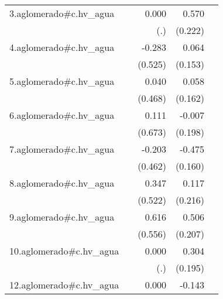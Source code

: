 {\begin{longtable}{l*{4}{D{.}{.}{-1}}}
\addlinespace
3.aglomerado#c.hv\_agua&                     &       0.000         &       0.570\sym{*}  &                     \\
            &                     &         (.)         &     (0.222)         &                     \\
\addlinespace
4.aglomerado#c.hv\_agua&                     &      -0.283         &       0.064         &                     \\
            &                     &     (0.525)         &     (0.153)         &                     \\
\addlinespace
5.aglomerado#c.hv\_agua&                     &       0.040         &       0.058         &                     \\
            &                     &     (0.468)         &     (0.162)         &                     \\
\addlinespace
6.aglomerado#c.hv\_agua&                     &       0.111         &      -0.007         &                     \\
            &                     &     (0.673)         &     (0.198)         &                     \\
\addlinespace
7.aglomerado#c.hv\_agua&                     &      -0.203         &      -0.475\sym{**} &                     \\
            &                     &     (0.462)         &     (0.160)         &                     \\
\addlinespace
8.aglomerado#c.hv\_agua&                     &       0.347         &       0.117         &                     \\
            &                     &     (0.522)         &     (0.216)         &                     \\
\addlinespace
9.aglomerado#c.hv\_agua&                     &       0.616         &       0.506\sym{*}  &                     \\
            &                     &     (0.556)         &     (0.207)         &                     \\
\addlinespace
10.aglomerado#c.hv\_agua&                     &       0.000         &       0.304         &                     \\
            &                     &         (.)         &     (0.195)         &                     \\
\addlinespace
12.aglomerado#c.hv\_agua&                     &       0.000         &      -0.143         &                     \\

\end{longtable}}
